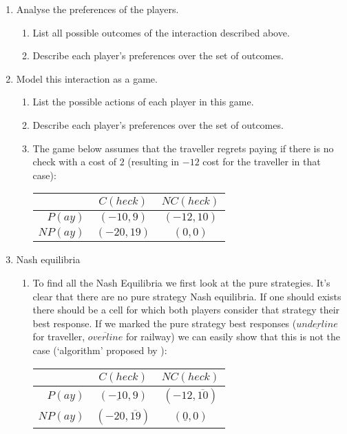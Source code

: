 \documentclass[../main.tex]{subfiles}
\begin{document}
\begin{solution}
\begin{enumerate}
	\item Analyse the preferences of the players.
	\begin{enumerate}
		\item List all possible outcomes of the interaction described above.
		\item Describe each player’s preferences over the set of outcomes.
	\end{enumerate}
	\item Model this interaction as a game.
	\begin{enumerate}
		\item List the possible actions of each player in this game.
		\item Describe each player’s preferences over the set of outcomes.
		\item The game below assumes that the traveller regrets paying if there is no check with a cost of $2$ (resulting in $-12$ cost for the traveller in that case):
			\begin{center}
				\begin{tabular}{|r|c|c|}
					\hline
					& $C(heck)$ & $NC(heck)$ \\
					\hline
					$P(ay)$ & $(-10,9)$ & $(-12,10)$ \\
					\hline
					$NP(ay)$ & $(-20,19)$ & $(0,0)$ \\
					\hline
				\end{tabular}
			\end{center}
	\end{enumerate}
	
	\item Nash equilibria
	\begin{enumerate}
		\item To find all the Nash Equilibria we first look at the pure strategies.
			It's clear that there are no pure strategy Nash equilibria. If one should exists there should be a cell for which both players consider that strategy their best response. If we marked the pure strategy best responses ($\underline{underline}$ for traveller, $\overline{overline}$ for railway) we can easily show that this is not the case (`algorithm' proposed by \cite{purenasheq}):\\
		 \setlength\extrarowheight{1pt}
		 \begin{center}
			 \begin{tabular}{|r|c|c|}
				 \hline
				 & $C(heck)$ & $NC(heck)$ \\
				 \hline
				 $P(ay)$ & $(\underline{-10},9)$ & $(-12,\overline{10})$ \\ 
				 \hline
				 $NP(ay)$ & $(-20,\overline{19})$ & $(\underline{0},0)$ \\ 
				 \hline
			 \end{tabular}
		 \end{center}


\end{enumerate}
\end{enumerate}
\end{solution}
\end{document}
